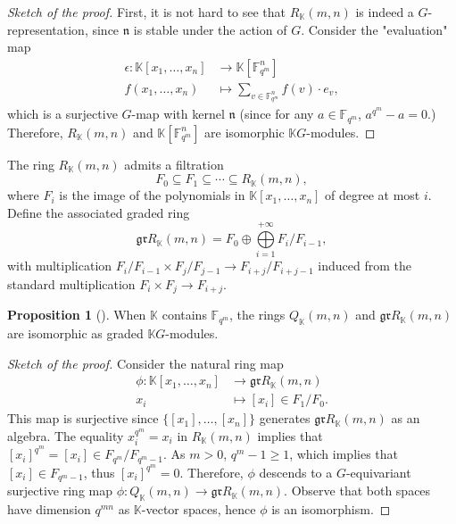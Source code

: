 \documentclass[12pt,a4paper]{report}
\theoremstyle{definition}
\newtheorem{proposition}[theorem]{Proposition}
\theoremstyle{remark}
\theoremstyle{definition}
\begin{document}
\begin{proof}[Sketch of the proof]
    First, it is not hard to see that $R_{\mathbb{K}}(m, n)$ is indeed a $G$-representation, since $\mathfrak{n}$ is stable under the action of $G$. Consider the "evaluation" map 
    \begin{align*}
        \epsilon: \mathbb{K}[x_1, \ldots, x_n]&\to \mathbb{K}[\mathbb{F}_{q^m}^{n}]\\
        f(x_1, \ldots, x_n) &\mapsto \sum\limits_{v\in \mathbb{F}_{q^m}^{n}} f(v)\cdot e_v,
    \end{align*}
    which is a surjective $G$-map with kernel $\mathfrak{n}$ (since for any $a\in \mathbb{F}_{q^m}$, $a^{q^m}-a=0$.) Therefore, $R_{\mathbb{K}}(m, n)$ and $\mathbb{K}[\mathbb{F}_{q^m}^{n}]$ are isomorphic $\mathbb{K}G$-modules.
\end{proof}
The ring $R_{\mathbb{K}}(m, n)$ admits a filtration
\begin{equation*}
    F_0 \subseteq F_1 \subseteq \cdots \subseteq R_{\mathbb{K}}(m, n),
\end{equation*}
where $F_i$ is the image of the polynomials in $\mathbb{K}[x_1, \ldots, x_n]$ of degree at most $i$. Define the associated graded ring
\begin{equation*}
    \mathfrak{gr}R_{\mathbb{K}}(m, n) = F_0 \oplus \bigoplus\limits_{i=1}^{+\infty}F_{i}/F_{i-1},
\end{equation*}
with multiplication $F_{i}/F_{i-1}\times F_{j}/F_{j-1}\to F_{i+j}/F_{i+j-1}$ induced from the standard multiplication $F_{i}\times F_{j}\to F_{i+j}$.
\begin{proposition}[{\cite[Proposition 6.10]{Lewis_Reiner_Stanton_2017}}]\label{prop:grR_and_Q}
    When $\mathbb{K}$ contains $\mathbb{F}_{q^m}$, the rings $Q_{\mathbb{K}}(m, n)$ and $\mathfrak{gr}R_{\mathbb{K}}(m, n)$ are isomorphic as graded $\mathbb{K}G$-modules.
\end{proposition}
\begin{proof}[Sketch of the proof]
    Consider the natural ring map
    \begin{align*}
        \phi: \mathbb{K}[x_1, \ldots, x_n] &\to \mathfrak{gr}R_{\mathbb{K}}(m, n)\\ 
        x_i &\mapsto [x_i] \in F_1/F_0.
    \end{align*}
    This map is surjective since $\{[x_1], \ldots, [x_n]\}$ generates $\mathfrak{gr}R_{\mathbb{K}}(m, n)$ as an algebra. The equality $x_i^{q^m} = x_i$ in $R_{\mathbb{K}}(m, n)$ implies that $[x_i]^{q^m} = [x_i]\in F_{q^m}/F_{q^m-1}$. As $m>0$, $q^m-1\geq 1$, which implies that $[x_i]\in F_{q^m-1}$, thus $[x_i]^{q^m} = 0$. Therefore, $\phi$ descends to a $G$-equivariant surjective ring map $\phi: Q_{\mathbb{K}}(m, n)\to \mathfrak{gr}R_{\mathbb{K}}(m, n)$. Observe that both spaces have dimension $q^{mn}$ as $\mathbb{K}$-vector spaces, hence $\phi$ is an isomorphism.
\end{proof}
\end{document}
